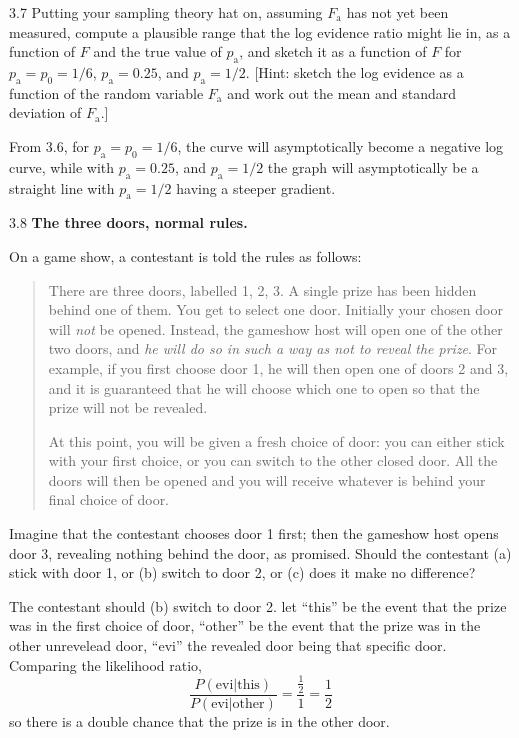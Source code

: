 \documentclass[12pt, a4paper]{article}
\begin{document}
\begin{prob}{3.7}
    Putting your sampling theory hat on, assuming $F_{\mathrm{a}}$ has not yet been measured, compute a plausible range that the log evidence ratio might lie in, as a function of $F$ and the true value of $p_{\mathrm{a}}$, and sketch it as a function of $F$ for $p_{\mathrm{a}} = p_0 = 1/6$, $p_{\mathrm{a}} = 0.25$, and $p_{\mathrm{a}} = 1/2$. [Hint: sketch the log evidence as a function of the random variable $F_{\mathrm{a}}$ and work out the mean and standard deviation of $F_{\mathrm{a}}$.]
\end{prob}
\begin{sol}
    From 3.6, for $p_{\mathrm{a}} = p_0 = 1/6$, the curve will asymptotically become a negative log curve, while with $p_{\mathrm{a}} = 0.25$, and $p_{\mathrm{a}} = 1/2$ the graph will asymptotically be a straight line with $p_{\mathrm{a}} = 1/2$ having a steeper gradient.
\end{sol}
\bigskip

\begin{prob}{3.8}
    \textbf{The three doors, normal rules.}

On a game show, a contestant is told the rules as follows:
\begin{quotation}
There are three doors, labelled 1, 2, 3. A single prize has been hidden behind one of them. You get to select one door. Initially your chosen door will \textit{not} be opened. Instead, the gameshow host will open one of the other two doors, and \textit{he will do so in such a way as not to reveal the prize}. For example, if you first choose door 1, he will then open one of doors 2 and 3, and it is guaranteed that he will choose which one to open so that the prize will not be revealed.

At this point, you will be given a fresh choice of door: you can either stick with your first choice, or you can switch to the other closed door. All the doors will then be opened and you will receive whatever is behind your final choice of door.
\end{quotation}
Imagine that the contestant chooses door 1 first; then the gameshow host opens door 3, revealing nothing behind the door, as promised. Should the contestant (a) stick with door 1, or (b) switch to door 2, or (c) does it make no difference?
\end{prob}
\begin{sol}
    The contestant should (b) switch to door 2. let ``this'' be the event that the prize was in the first choice of door, ``other'' be the event that the prize was in the other unrevelead door, ``evi'' the revealed door being that specific door. Comparing the likelihood ratio, \\
    $$\frac{P(\text{evi} | \text{this})}{P(\text{evi} | \text{other})} = \frac{\frac{1}{2}}{1} = \frac{1}{2}$$
    so there is a double chance that the prize is in the other door.
\end{sol}
\bigskip
\end{document}
